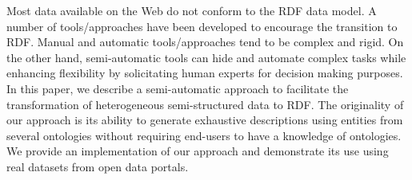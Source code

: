 Most data available on the Web do not conform to the RDF data model. A number of tools/approaches have been developed to encourage the transition to RDF. Manual and automatic tools/approaches tend to be complex and rigid. On the other hand, semi-automatic tools can hide and automate complex tasks while enhancing flexibility by solicitating human experts for decision making purposes. In this paper, we describe a semi-automatic approach to facilitate the transformation of heterogeneous semi-structured data to RDF. The originality of our approach is its ability to generate exhaustive descriptions using entities from several ontologies without requiring end-users to have a knowledge of ontologies. We provide an implementation of our approach and demonstrate  its use using real datasets from open data portals.




